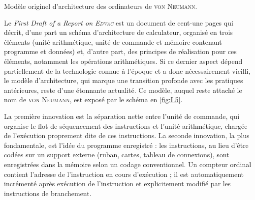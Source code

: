 \begin{marginfigure}
	\caption{\label{fig:I.5}Modèle originel d’architecture des ordinateurs de \textsc{von Neumann}.}
\end{marginfigure}

Le \textit{First Draft of a Report on \textsc{Edvac}} est un document de cent-une pages qui décrit, d’une part un schéma d’architecture de calculateur, organisé en trois éléments (unité arithmétique, unité de commande et mémoire contenant programme et données) et, d’autre part, des principes de réalisation pour ces éléments, notamment les opérations arithmétiques. Si ce dernier aspect dépend partiellement de la technologie connue à l’époque et a donc nécessairement vieilli, le modèle d’architecture, qui marque une transition profonde avec les pratiques antérieures, reste d’une étonnante actualité. Ce modèle, auquel reste attaché le nom de \textsc{von Neumann}, est exposé par le schéma en \cref{fig:I.5}.

La première innovation est la séparation nette entre l’unité de commande, qui organise le flot de séquencement des instructions et l’unité arithmétique, chargée de l’exécution proprement dite de ces instructions. La seconde innovation, la plus fondamentale, est l’idée du programme enregistré : les instructions, au lieu d’être codées sur un support externe (ruban, cartes, tableau de connexions), sont enregistrées dans la mémoire selon un codage conventionnel. Un compteur ordinal contient l’adresse de l’instruction en cours d’exécution ; il est automatiquement incrémenté après exécution de l’instruction et explicitement modifié par les instructions de branchement.

